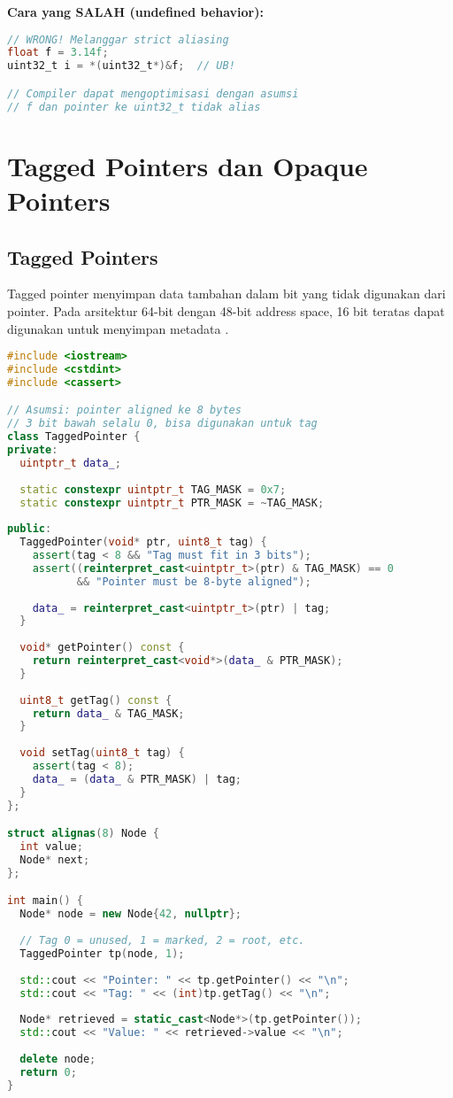 \documentclass[../main.tex]{subfiles}
\begin{document}
\textbf{Cara yang SALAH (undefined behavior):}
\begin{lstlisting}[language=C, caption={Type punning yang salah --- JANGAN LAKUKAN INI}]
// WRONG! Melanggar strict aliasing
float f = 3.14f;
uint32_t i = *(uint32_t*)&f;  // UB!

// Compiler dapat mengoptimisasi dengan asumsi
// f dan pointer ke uint32_t tidak alias
\end{lstlisting}

\section{Tagged Pointers dan Opaque Pointers}

\subsection{Tagged Pointers}
Tagged pointer menyimpan data tambahan dalam bit yang tidak digunakan dari pointer. Pada arsitektur 64-bit dengan 48-bit address space, 16 bit teratas dapat digunakan untuk menyimpan metadata \parencite{cpp-reference}.

\begin{lstlisting}[language=C++, caption={Tagged pointer sederhana}]
#include <iostream>
#include <cstdint>
#include <cassert>

// Asumsi: pointer aligned ke 8 bytes
// 3 bit bawah selalu 0, bisa digunakan untuk tag
class TaggedPointer {
private:
  uintptr_t data_;
  
  static constexpr uintptr_t TAG_MASK = 0x7;
  static constexpr uintptr_t PTR_MASK = ~TAG_MASK;
  
public:
  TaggedPointer(void* ptr, uint8_t tag) {
    assert(tag < 8 && "Tag must fit in 3 bits");
    assert((reinterpret_cast<uintptr_t>(ptr) & TAG_MASK) == 0 
           && "Pointer must be 8-byte aligned");
    
    data_ = reinterpret_cast<uintptr_t>(ptr) | tag;
  }
  
  void* getPointer() const {
    return reinterpret_cast<void*>(data_ & PTR_MASK);
  }
  
  uint8_t getTag() const {
    return data_ & TAG_MASK;
  }
  
  void setTag(uint8_t tag) {
    assert(tag < 8);
    data_ = (data_ & PTR_MASK) | tag;
  }
};

struct alignas(8) Node {
  int value;
  Node* next;
};

int main() {
  Node* node = new Node{42, nullptr};
  
  // Tag 0 = unused, 1 = marked, 2 = root, etc.
  TaggedPointer tp(node, 1);
  
  std::cout << "Pointer: " << tp.getPointer() << "\n";
  std::cout << "Tag: " << (int)tp.getTag() << "\n";
  
  Node* retrieved = static_cast<Node*>(tp.getPointer());
  std::cout << "Value: " << retrieved->value << "\n";
  
  delete node;
  return 0;
}
\end{lstlisting}
\end{document}
